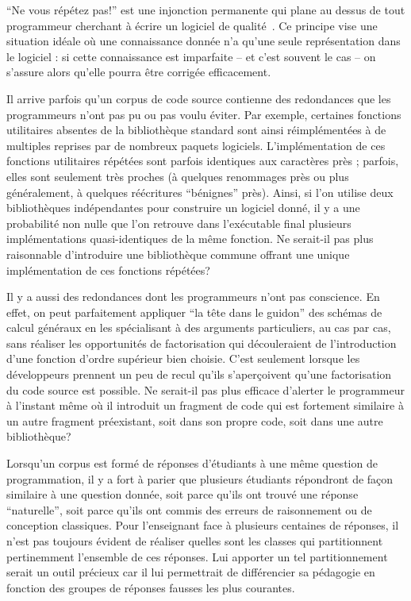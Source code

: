 
``Ne vous répétez pas!'' est une injonction permanente qui plane au
dessus de tout programmeur cherchant à écrire un logiciel de
qualité~\cite{Hunt:2000:PPJ:320326}. Ce principe vise une situation
idéale où une connaissance donnée n'a qu'une seule représentation dans
le logiciel : si cette connaissance est imparfaite -- et c'est souvent
le cas -- on s'assure alors qu'elle pourra être corrigée efficacement.

Il arrive parfois qu'un corpus de code source contienne des
redondances que les programmeurs n'ont pas pu ou pas voulu éviter. Par
exemple, certaines fonctions utilitaires absentes de la bibliothèque
standard sont ainsi réimplémentées à de multiples reprises par de
nombreux paquets logiciels. L'implémentation de ces fonctions
utilitaires répétées sont parfois identiques aux caractères près ;
parfois, elles sont seulement très proches (à quelques renommages près
ou plus généralement, à quelques réécritures ``bénignes''
près). Ainsi, si l'on utilise deux bibliothèques indépendantes pour
construire un logiciel donné, il y a une probabilité non nulle que
l'on retrouve dans l'exécutable final plusieurs implémentations
quasi-identiques de la même fonction. Ne serait-il pas plus
raisonnable d'introduire une bibliothèque commune offrant une unique
implémentation de ces fonctions répétées?

Il y a aussi des redondances dont les programmeurs n'ont pas conscience.
En effet, on peut parfaitement appliquer ``la tête dans le guidon''
des schémas de calcul généraux en les spécialisant à des arguments
particuliers, au cas par cas, sans réaliser les opportunités de
factorisation qui découleraient de l'introduction d'une fonction
d'ordre supérieur bien choisie. C'est seulement lorsque les
développeurs prennent un peu de recul qu'ils s'aperçoivent qu'une
factorisation du code source est possible. Ne serait-il pas plus
efficace d'alerter le programmeur à l'instant même où il introduit
un fragment de code qui est fortement similaire à un autre fragment
préexistant, soit dans son propre code, soit dans une autre
bibliothèque?

Lorsqu'un corpus est formé de réponses d'étudiants à une même question
de programmation, il y a fort à parier que plusieurs étudiants
répondront de façon similaire à une question donnée, soit parce qu'ils
ont trouvé une réponse ``naturelle'', soit parce qu'ils ont commis des
erreurs de raisonnement ou de conception classiques.  Pour
l'enseignant face à plusieurs centaines de réponses, il n'est pas
toujours évident de réaliser quelles sont les classes qui
partitionnent pertinemment l'ensemble de ces réponses. Lui apporter un
tel partitionnement serait un outil précieux car il lui permettrait de
différencier sa pédagogie en fonction des groupes de réponses fausses
les plus courantes.


